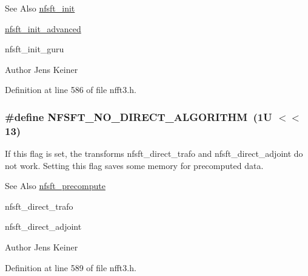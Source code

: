 \begin{DoxySeeAlso}{See Also}
\hyperlink{group__nfsft_ga65cda3f4a3edc5eb39c697cf34b1f0b9}{nfsft\-\_\-init} 

\hyperlink{group__nfsft_ga2812aa5beba0eb7efd3072bf323a0155}{nfsft\-\_\-init\-\_\-advanced} 

nfsft\-\_\-init\-\_\-guru 
\end{DoxySeeAlso}
\begin{DoxyAuthor}{Author}
Jens Keiner 
\end{DoxyAuthor}


Definition at line 586 of file nfft3.\-h.

\hypertarget{group__nfsft_ga9ed987164acf6e362ab2878506fbca95}{
\subsubsection[{N\-F\-S\-F\-T\-\_\-\-N\-O\-\_\-\-D\-I\-R\-E\-C\-T\-\_\-\-A\-L\-G\-O\-R\-I\-T\-H\-M}]{\setlength{\rightskip}{0pt plus 5cm}\#define N\-F\-S\-F\-T\-\_\-\-N\-O\-\_\-\-D\-I\-R\-E\-C\-T\-\_\-\-A\-L\-G\-O\-R\-I\-T\-H\-M~(1\-U $<$$<$ 13)}}\label{group__nfsft_ga9ed987164acf6e362ab2878506fbca95}
If this flag is set, the transforms nfsft\-\_\-direct\-\_\-trafo and nfsft\-\_\-direct\-\_\-adjoint do not work. Setting this flag saves some memory for precomputed data.

\begin{DoxySeeAlso}{See Also}
\hyperlink{group__nfsft_gabe87aeea1f7cfef9ae8febb16d702f3b}{nfsft\-\_\-precompute} 

nfsft\-\_\-direct\-\_\-trafo 

nfsft\-\_\-direct\-\_\-adjoint 
\end{DoxySeeAlso}
\begin{DoxyAuthor}{Author}
Jens Keiner 
\end{DoxyAuthor}


Definition at line 589 of file nfft3.\-h.



